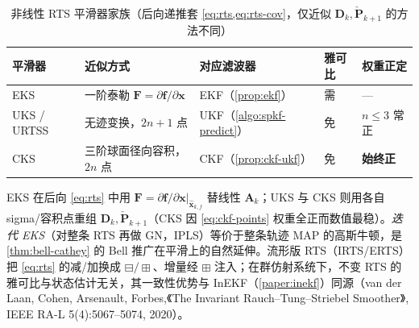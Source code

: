 \begin{table}[H]\centering\small
\caption{非线性 RTS 平滑器家族（后向递推套 \cref{eq:rts,eq:rts-cov}，仅近似 $\mathbf{D}_k,\check{\mathbf{P}}_{k+1}$ 的方法不同）}
\label{tab:nonlinear-rts}
\begin{tabular}{lllll}
\toprule
平滑器 & 近似方式 & 对应滤波器 & 雅可比 & 权重正定 \\
\midrule
EKS & 一阶泰勒 $\mathbf{F}=\partial\mathbf{f}/\partial\mathbf{x}$ & EKF（\cref{prop:ekf}） & 需 & --- \\
UKS / URTSS & 无迹变换，$2n+1$ 点 & UKF（\cref{algo:spkf-predict}） & 免 & $n\le3$ 常正 \\
CKS & 三阶球面径向容积，$2n$ 点 & CKF（\cref{prop:ckf-ukf}） & 免 & \textbf{始终正} \\
\bottomrule
\end{tabular}
\end{table}

\noindent EKS 在后向 \cref{eq:rts} 中用 $\mathbf{F}=\partial\mathbf{f}/\partial\mathbf{x}|_{\hat{\mathbf{x}}_{k,f}}$ 替线性 $\mathbf{A}_k$；UKS\cite{sarkka2008unscented} 与 CKS\cite{arasaratnam2011smoother} 则用各自 sigma/容积点重组 $\mathbf{D}_k,\check{\mathbf{P}}_{k+1}$（CKS 因 \cref{eq:ckf-points} 权重全正而数值最稳）。\emph{迭代 EKS}（对整条 RTS 再做 GN，IPLS）等价于整条轨迹 MAP 的高斯牛顿，是 \cref{thm:bell-cathey} 的 Bell 推广在平滑上的自然延伸\cite{bell1993iterated}。流形版 RTS（IRTS/ERTS）把 \cref{eq:rts} 的减/加换成 $\boxminus/\boxplus$、增量经 $\boxplus$ 注入；在群仿射系统下，不变 RTS 的雅可比与状态估计无关，其一致性优势与 InEKF（\cref{paper:inekf}）同源\cite{vanderlaan2020invariant}（van der Laan, Cohen, Arsenault, Forbes,《The Invariant Rauch--Tung--Striebel Smoother》, IEEE RA-L 5(4):5067--5074, 2020）。

